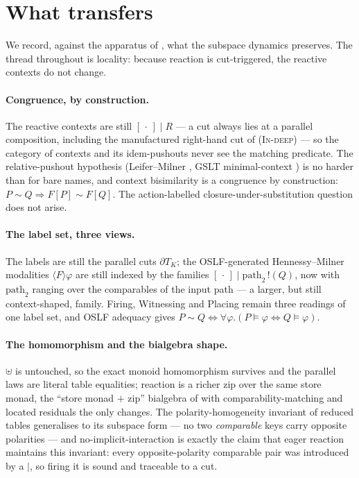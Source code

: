 \documentclass[11pt]{article}
\theoremstyle{plain}
\theoremstyle{definition}
\newcommand{\rout}[2]{#1\,!(#2)}
\newcommand{\bis}{\sim}
\begin{document}
\section{What transfers}\label{sec:transfer}

We record, against the apparatus of \cite{KnotRho}, what the subspace dynamics preserves. The thread
throughout is locality: because reaction is cut-triggered, the reactive contexts do not change.

\paragraph{Congruence, by construction.}
The reactive contexts are still $[\,\cdot\,]\mid R$ --- a cut always lies at a parallel composition,
including the manufactured right-hand cut of \textsc{(In-deep)} --- so the category of contexts and
its idem-pushouts never see the matching predicate. The relative-pushout hypothesis (Leifer--Milner
\cite{LM00,Sewell02}, GSLT minimal-context \cite{GSLT}) is no harder than for bare names, and context
bisimilarity is a congruence by construction: $P\bis Q\Rightarrow F[P]\bis F[Q]$. The
action-labelled closure-under-substitution question does not arise.

\paragraph{The label set, three views.}
The labels are still the parallel cuts $\partial T_{K}$; the OSLF-generated Hennessy--Milner
modalities $\langle F\rangle\varphi$ are still indexed by the families
$[\,\cdot\,]\mid\rout{\mathrm{path}_2}{Q}$, now with $\mathrm{path}_2$ ranging over the comparables of
the input path --- a larger, but still context-shaped, family. Firing, Witnessing and Placing remain
three readings of one label set, and OSLF adequacy gives
$P\bis Q\Leftrightarrow\forall\varphi.(P\models\varphi\Leftrightarrow Q\models\varphi)$.

\paragraph{The homomorphism and the bialgebra shape.}
$\uplus$ is untouched, so the exact monoid homomorphism survives and the parallel laws are literal
table equalities; reaction is a richer zip over the same store monad, the ``store monad $+$ zip''
bialgebra of \cite{KnotRho} with comparability-matching and located residuals the only changes. The
polarity-homogeneity invariant of reduced tables generalises to its subspace form --- no two
\emph{comparable} keys carry opposite polarities --- and no-implicit-interaction is exactly the claim
that eager reaction maintains this invariant: every opposite-polarity comparable pair was introduced
by a $\mid$, so firing it is sound and traceable to a cut.
\end{document}
